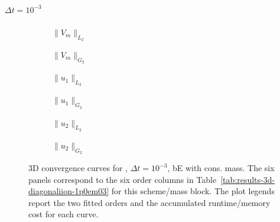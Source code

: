 \paragraph{$\Delta t=10^{-3}$}

\begin{figure}[p]
\centering
\begin{subfigure}{0.485\linewidth}
\centering
{}
\caption{$\|V_m\|_{L_2}$}
\label{fig:results-3d-diagonaliion-1p0em03-backwardeuler-consistent-a}
\end{subfigure}
\hfill
\begin{subfigure}{0.485\linewidth}
\centering
{}
\caption{$\|V_m\|_{G_2}$}
\label{fig:results-3d-diagonaliion-1p0em03-backwardeuler-consistent-b}
\end{subfigure}
\par\vspace{0.8em}
\begin{subfigure}{0.485\linewidth}
\centering
{}
\caption{$\|u_1\|_{L_2}$}
\label{fig:results-3d-diagonaliion-1p0em03-backwardeuler-consistent-c}
\end{subfigure}
\hfill
\begin{subfigure}{0.485\linewidth}
\centering
{}
\caption{$\|u_1\|_{G_2}$}
\label{fig:results-3d-diagonaliion-1p0em03-backwardeuler-consistent-d}
\end{subfigure}
\par\vspace{0.8em}
\begin{subfigure}{0.485\linewidth}
\centering
{}
\caption{$\|u_2\|_{L_2}$}
\label{fig:results-3d-diagonaliion-1p0em03-backwardeuler-consistent-e}
\end{subfigure}
\hfill
\begin{subfigure}{0.485\linewidth}
\centering
{}
\caption{$\|u_2\|_{G_2}$}
\label{fig:results-3d-diagonaliion-1p0em03-backwardeuler-consistent-f}
\end{subfigure}
\caption{3D convergence curves for , $\Delta t=10^{-3}$, bE with cons. mass. The six panels correspond to the six order columns in Table~\ref{tab:results-3d-diagonaliion-1p0em03} for this scheme/mass block. The plot legends report the two fitted orders and the accumulated runtime/memory cost for each curve.}
\label{fig:results-3d-diagonaliion-1p0em03-backwardeuler-consistent}
\end{figure}
\FloatBarrier

